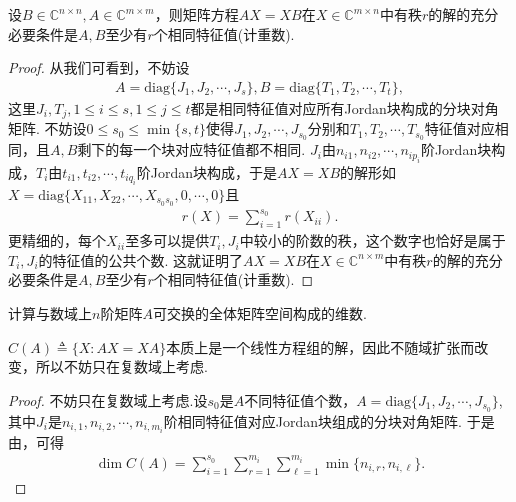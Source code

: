 \documentclass[../../main.tex]{subfiles}
\begin{document}
\begin{corollary}\label{corollary:AX-XB相关命题1}
设$B\in\mathbb{C}^{n\times n}, A\in\mathbb{C}^{m\times m}$，则矩阵方程$AX = XB$在$X\in\mathbb{C}^{m\times n}$中有秩$r$的解的充分必要条件是$A,B$至少有$r$个相同特征值(计重数).
\end{corollary}
\begin{proof}
从我们可看到，不妨设
\begin{align*}
A = \mathrm{diag}\{J_1, J_2, \cdots, J_s\}, B = \mathrm{diag}\{T_1, T_2, \cdots, T_t\},
\end{align*}
这里$J_i, T_j, 1\leqslant i\leqslant s, 1\leqslant j\leqslant t$都是相同特征值对应所有Jordan块构成的分块对角矩阵. 不妨设$0\leqslant s_0\leqslant\min\{s, t\}$使得$J_1, J_2, \cdots, J_{s_0}$分别和$T_1, T_2, \cdots, T_{s_0}$特征值对应相同，且$A,B$剩下的每一个块对应特征值都不相同. $J_i$由$n_{i1}, n_{i2}, \cdots, n_{ip_i}$阶Jordan块构成，$T_i$由$t_{i1}, t_{i2}, \cdots, t_{iq_i}$阶Jordan块构成，于是$AX = XB$的解形如$X = \mathrm{diag}\{X_{11}, X_{22}, \cdots, X_{s_0s_0}, 0, \cdots, 0\}$且
\begin{align*}
r(X) = \sum_{i = 1}^{s_0}r(X_{ii}).
\end{align*}
更精细的，每个$X_{ii}$至多可以提供$T_i, J_i$中较小的阶数的秩，这个数字也恰好是属于$T_i, J_i$的特征值的公共个数. 这就证明了$AX = XB$在$X\in\mathbb{C}^{n\times m}$中有秩$r$的解的充分必要条件是$A,B$至少有$r$个相同特征值(计重数). 

\end{proof}

\begin{corollary}\label{corollary:AX-XB相关命题3}
计算与数域上$n$阶矩阵$A$可交换的全体矩阵空间构成的维数. 
\end{corollary}
\begin{note}
$C(A)\triangleq\{X: AX = XA\}$本质上是一个线性方程组的解，因此不随域扩张而改变，所以不妨只在复数域上考虑.
\end{note}
\begin{proof}
不妨只在复数域上考虑.设$s_0$是$A$不同特征值个数，$A = \mathrm{diag}\{J_1, J_2, \cdots, J_{s_0}\}$,其中$J_i$是$n_{i,1},n_{i,2},\cdots,n_{i,m_i}$阶相同特征值对应Jordan块组成的分块对角矩阵.
于是由，可得
\begin{align*}
\dim C(A) = \sum_{i = 1}^{s_0}\sum_{r = 1}^{m_i}\sum_{\ell = 1}^{m_i}\min\{n_{i,r}, n_{i,\ell}\}.
\end{align*}

\end{proof}
\end{document}
